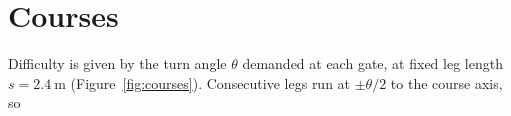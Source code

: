 \documentclass[11pt,a4paper]{article}
\begin{document}
\section{Courses}


Difficulty is given by the turn angle $\theta$ demanded at each gate, at fixed leg length $s=\SI{2.4}{\metre}$ (Figure~\ref{fig:courses}). Consecutive legs run at $\pm\theta/2$ to the course axis, so
\end{document}
